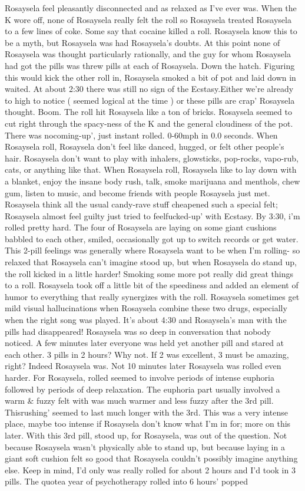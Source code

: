 \documentclass[12pt]{book}
\begin{document}
Rosaysela feel pleasantly disconnected and as relaxed as I've ever was. When the K wore off, none of Rosaysela really felt the roll so Rosaysela treated Rosaysela to a few lines of coke. Some say that cocaine killed a roll. Rosaysela know this to be a myth, but Rosaysela was had Rosaysela's doubts. At this point none of Rosaysela was thought particularly rationally, and the guy for whom Rosaysela had got the pills was threw pills at each of Rosaysela. Down the hatch. Figuring this would kick the other roll in, Rosaysela smoked a bit of pot and laid down in waited. At about 2:30 there was still no sign of the Ecstasy.Either we're already to high to notice ( seemed logical at the time ) or these pills are crap' Rosaysela thought. Boom. The roll hit Rosaysela like a ton of bricks. Rosaysela seemed to cut right through the spacy-ness of the K and the general cloudiness of the pot. There was nocoming-up', just instant rolled. 0-60mph in 0.0 seconds. When Rosaysela roll, Rosaysela don't feel like danced, hugged, or felt other people's hair. Rosaysela don't want to play with inhalers, glowsticks, pop-rocks, vapo-rub, cats, or anything like that. When Rosaysela roll, Rosaysela like to lay down with a blanket, enjoy the insane body rush, talk, smoke marijuana and menthols, chew gum, listen to music, and become friends with people Rosaysela just met. Rosaysela think all the usual candy-rave stuff cheapened such a special felt; Rosaysela almost feel guilty just tried to feelfucked-up' with Ecstasy. By 3:30, i'm rolled pretty hard. The four of Rosaysela are laying on some giant cushions babbled to each other, smiled, occasionally got up to switch records or get water. This 2-pill feelings was generally where Rosaysela want to be when I'm rolling- so relaxed that Rosaysela can't imagine stood up, but when Rosaysela do stand up, the roll kicked in a little harder! Smoking some more pot really did great things to a roll. Rosaysela took off a little bit of the speediness and added an element of humor to everything that really synergizes with the roll. Rosaysela sometimes get mild visual hallucinations when Rosaysela combine these two drugs, especially when the right song was played. It's about 4:30 and Rosaysela's man with the pills had disappeared! Rosaysela was so deep in conversation that nobody noticed. A few minutes later everyone was held yet another pill and stared at each other. 3 pills in 2 hours? Why not. If 2 was excellent, 3 must be amazing, right? Indeed Rosaysela was. Not 10 minutes later Rosaysela was rolled even harder. For Rosaysela, rolled seemed to involve periods of intense euphoria followed by periods of deep relaxation. The euphoria part usually involved a warm \& fuzzy felt with was much warmer and less fuzzy after the 3rd pill. Thisrushing' seemed to last much longer with the 3rd. This was a very intense place, maybe too intense if Rosaysela don't know what I'm in for; more on this later. With this 3rd pill, stood up, for Rosaysela, was out of the question. Not because Rosaysela wasn't physically able to stand up, but because laying in a giant soft cushion felt so good that Rosaysela couldn't possibly imagine anything else. Keep in mind, I'd only was really rolled for about 2 hours and I'd took in 3 pills. The quotea year of psychotherapy rolled into 6 hours' popped 
\end{document}
